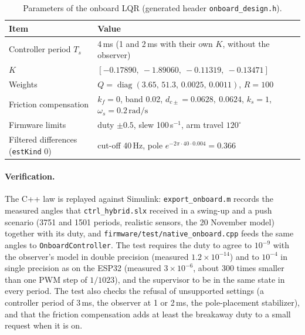 \documentclass[a4paper,11pt]{article}
\begin{document}
\begin{table}[h]
\centering
\caption{Parameters of the onboard LQR (generated header \texttt{onboard\_design.h}).}
\label{tab:lqr_impl}
\small
\begin{tabular}{@{}ll@{}}
\toprule
Item & Value \\
\midrule
Controller period $T_s$ & 4\,ms (1 and 2\,ms with their own $K$, without the observer) \\
$K$ & $[-0.17890,\ -1.89060,\ -0.11319,\ -0.13471]$ \\
Weights & $Q = \operatorname{diag}(3.65,\,51.3,\,0.0025,\,0.0011)$, $R = 100$ \\
Friction compensation & $k_f = 0$, band 0.02, $d_{c\pm} = 0.0628,\ 0.0624$, $k_s = 1$, $\omega_s = 0.2\,\mathrm{rad/s}$ \\
Firmware limits & duty $\pm0.5$, slew 100\,s$^{-1}$, arm travel $120^\circ$ \\
Filtered differences (\texttt{estKind} 0) & cut-off 40\,Hz, pole $e^{-2\pi\cdot40\cdot0.004} = 0.366$ \\
\bottomrule
\end{tabular}
\end{table}

\paragraph{Verification.} The C++ law is replayed against Simulink: \texttt{export\_onboard.m} records the measured angles that \nolinkurl{ctrl_hybrid.slx} received in a swing-up and a push scenario (3751 and 1501 periods, realistic sensors, the 20 November model) together with its duty, and \nolinkurl{firmware/test/native_onboard.cpp} feeds the same angles to \texttt{OnboardController}. The test requires the duty to agree to $10^{-9}$ with the observer's model in double precision (measured $1.2\times10^{-14}$) and to $10^{-4}$ in single precision as on the ESP32 (measured $3\times10^{-6}$, about 300 times smaller than one PWM step of $1/1023$), and the supervisor to be in the same state in every period. The test also checks the refusal of unsupported settings (a controller period of 3\,ms, the observer at 1 or 2\,ms, the pole-placement stabilizer), and that the friction compensation adds at least the breakaway duty to a small request when it is on.
\end{document}
